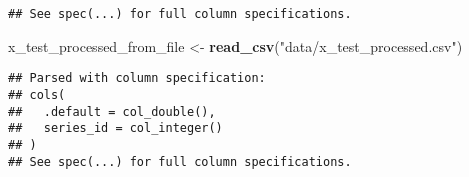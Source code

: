 \documentclass[]{article}
\newenvironment{Shaded}{\begin{snugshade}}{\end{snugshade}}
\newcommand{\KeywordTok}[1]{\textcolor[rgb]{0.13,0.29,0.53}{\textbf{#1}}}
\newcommand{\NormalTok}[1]{#1}
\newcommand{\StringTok}[1]{\textcolor[rgb]{0.31,0.60,0.02}{#1}}
\begin{document}
\begin{verbatim}
## See spec(...) for full column specifications.
\end{verbatim}

\begin{Shaded}
\begin{Highlighting}[]
\NormalTok{x_test_processed_from_file <-}\StringTok{ }\KeywordTok{read_csv}\NormalTok{(}\StringTok{"data/x_test_processed.csv"}\NormalTok{)}
\end{Highlighting}
\end{Shaded}

\begin{verbatim}
## Parsed with column specification:
## cols(
##   .default = col_double(),
##   series_id = col_integer()
## )
## See spec(...) for full column specifications.
\end{verbatim}
\end{document}

